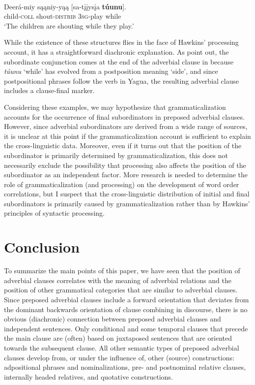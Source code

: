 \documentclass[output=paper]{langsci/langscibook}
\begin{document}
\ea\label{ex:diessel:21}
\\
\gll   Deerá-miy  sąąniy-yąą  [sa-tįįysįa  \textbf{túunu}].\\
       child-\textsc{coll}  shout-\textsc{distrib}  3\textsc{sg}-play  while\\
\glt   `The children are shouting while they play.'
\z

While the existence of these structures flies in the face of Hawkins’ processing account, it has a straightforward diachronic explanation. As \citet[340]{PaynePayne1990} point out, the subordinate conjunction comes at the end of the adverbial clause in  because \textit{túunu} ‘while’ has evolved from a postposition meaning ‘side’, and since postpositional phrases follow the verb in Yagua, the resulting adverbial clause includes a clause-final marker.\label{p:diessel:exception}

Considering these examples, we may hypothesize that grammaticalization accounts for the occurrence of final subordinators in preposed adverbial clauses. However, since adverbial subordinators are derived from a wide range of sources, it is unclear at this point if the grammaticalization account is sufficient to explain the cross-linguistic data. Moreover, even if it turns out that the position of the subordinator is primarily determined by grammaticalization, this does not necessarily exclude the possibility that processing also affects the position of the subordinator as an independent factor. More research is needed to determine the role of grammaticalization (and processing) on the development of word order correlations, but I suspect that the cross-linguistic distribution of initial and final subordinators is primarily caused by grammaticalization rather than by Hawkins’ principles of syntactic processing.

\section{Conclusion}

To summarize the main points of this paper, we have seen that the position of adverbial clauses correlates with the meaning of adverbial relations and the position of other grammatical categories that are similar to adverbial clauses. Since preposed adverbial clauses include a forward orientation that deviates from the dominant backwards orientation of clause combining in discourse, there is no obvious (diachronic) connection between preposed adverbial clauses and independent sentences. Only conditional and some temporal clauses that precede the main clause are (often) based on juxtaposed sentences that are oriented towards the subsequent clause. All other semantic types of preposed adverbial clauses develop from, or under the influence of, other (source) constructions: adpositional phrases and nominalizations, pre- and postnominal relative clauses, internally headed relatives, and quotative constructions.
\end{document}
